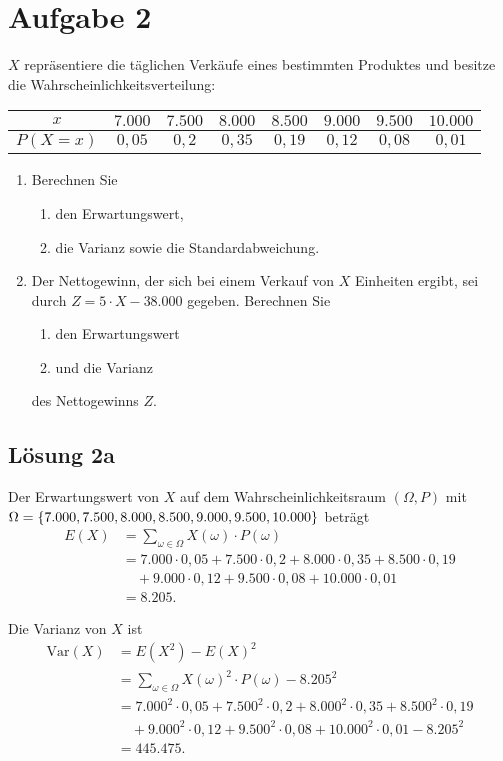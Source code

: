 \documentclass[main.tex]{subfiles}
\begin{document}
\section{Aufgabe 2}
$X$ repräsentiere die täglichen Verkäufe eines bestimmten Produktes und besitze die Wahrscheinlichkeitsverteilung:
\begin{center}
\begin{tabular}{c|c|c|c|c|c|c|c}
	$x$        & $7.000$ & $7.500$ & $8.000$ & $8.500$ & $9.000$ & $9.500$ & $10.000$ \\
	\hline
	$P(X {=} x)$ &  $0,05$ &   $0,2$ &  $0,35$ &  $0,19$ &  $0,12$ &  $0,08$ &   $0,01$ \\
\end{tabular}
\end{center}
\begin{enumerate}
\item Berechnen Sie
\begin{enumerate}
  	\item den Erwartungswert,
  	\item die Varianz sowie die Standardabweichung.
\end{enumerate}
\item Der Nettogewinn, der sich bei einem Verkauf von $X$ Einheiten ergibt, sei durch $Z = 5 \cdot X - 38.000$ gegeben. Berechnen Sie
\begin{enumerate}
  	\item den Erwartungswert
  	\item und die Varianz
\end{enumerate}
des Nettogewinns $Z$.
\end{enumerate}

\subsection{Lösung 2a}
Der Erwartungswert von $X$ auf dem Wahrscheinlichkeitsraum $(\Omega, P)$ mit $\Omega = \set*{7.000, 7.500, 8.000, 8.500, 9.000, 9.500, 10.000}$ beträgt $$\begin{aligned}
	E(X) &= \sum\limits_{\omega\in\Omega} X(\omega)\cdot P(\omega) \\
	&= 7.000\cdot 0,05 + 7.500\cdot 0,2 + 8.000 \cdot 0,35 + 8.500\cdot 0,19 \\
	&\quad + 9.000\cdot 0,12 + 9.500\cdot 0,08 + 10.000\cdot 0,01 \\
	&= 8.205.
\end{aligned}$$

Die Varianz von $X$ ist
$$\begin{aligned}
	\text{Var}(X) &= E\left(X^2\right) - E(X)^2 \\
	&= \sum\limits_{\omega\in\Omega} X(\omega)^2\cdot P(\omega) - 8.205^2 \\
	&= 7.000^2\cdot 0,05 + 7.500^2\cdot 0,2 + 8.000^2 \cdot 0,35 + 8.500^2\cdot 0,19 \\
	&\quad + 9.000^2\cdot 0,12 + 9.500^2\cdot 0,08 + 10.000^2\cdot 0,01  - 8.205^2\\
	&= 445.475.
\end{aligned}$$
\end{document}
